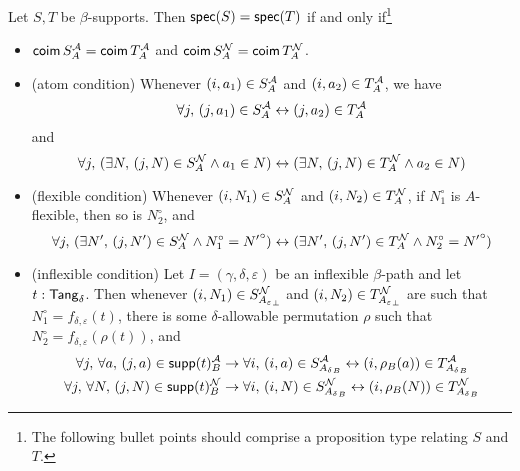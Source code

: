 \begin{proposition}
  \label{prop:spec_eq_spec_iff}
  Let \( S, T \) be \( \beta \)-supports.
  Then \( \operatorname{\mathsf{spec}}(S) = \operatorname{\mathsf{spec}}(T) \) if and only if\footnote{The following bullet points should comprise a proposition type relating \( S \) and \( T \).}
  \begin{itemize}
    \item \( \operatorname{\mathsf{coim}} S_A^{\mathcal A} = \operatorname{\mathsf{coim}} T_A^{\mathcal A} \) and \( \operatorname{\mathsf{coim}} S_A^{\mathcal N} = \operatorname{\mathsf{coim}} T_A^{\mathcal N} \).
    \item (atom condition) Whenever \( (i, a_1) \in S_A^{\mathcal A} \) and \( (i, a_2) \in T_A^{\mathcal A} \), we have
    \[ \forall j,\, (j, a_1) \in S_A^{\mathcal A} \leftrightarrow (j, a_2) \in T_A^{\mathcal A} \]
    and
    \[ \forall j,\, (\exists N,\, (j, N) \in S_A^{\mathcal N} \wedge a_1 \in N) \leftrightarrow (\exists N,\, (j, N) \in T_A^{\mathcal N} \wedge a_2 \in N) \]
    \item (flexible condition) Whenever \( (i, N_1) \in S_A^{\mathcal N} \) and \( (i, N_2) \in T_A^{\mathcal N} \), if \( N_1^\circ \) is \( A \)-flexible, then so is \( N_2^\circ \), and
    \[ \forall j,\, (\exists N',\, (j, N') \in S_A^{\mathcal N} \wedge N_1^\circ = {N'}^\circ) \leftrightarrow (\exists N',\, (j, N') \in T_A^{\mathcal N} \wedge N_2^\circ = {N'}^\circ) \]
    \item (inflexible condition) Let \( I = (\gamma,\delta,\varepsilon) \) be an inflexible \( \beta \)-path and let \( t : \mathsf{Tang}_\delta \).
    Then whenever \( (i, N_1) \in S_{{A_\varepsilon}_\bot}^{\mathcal N} \) and \( (i, N_2) \in T_{{A_\varepsilon}_\bot}^{\mathcal N} \) are such that \( N_1^\circ = f_{\delta,\varepsilon}(t) \), there is some \( \delta \)-allowable permutation \( \rho \) such that \( N_2^\circ = f_{\delta,\varepsilon}(\rho(t)) \), and
    \begin{align*}
      \forall j,\, \forall a,\, (j, a) \in \operatorname{\mathsf{supp}}(t)_B^{\mathcal A} &\to \forall i,\, (i, a) \in S_{{A_\delta}_B}^{\mathcal A} \leftrightarrow (i, \rho_B(a)) \in T_{{A_\delta}_B}^{\mathcal A} \\
      \forall j,\, \forall N,\, (j, N) \in \operatorname{\mathsf{supp}}(t)_B^{\mathcal N} &\to \forall i,\, (i, N) \in S_{{A_\delta}_B}^{\mathcal N} \leftrightarrow (i, \rho_B(N)) \in T_{{A_\delta}_B}^{\mathcal N}
    \end{align*}
  \end{itemize}
\end{proposition}
